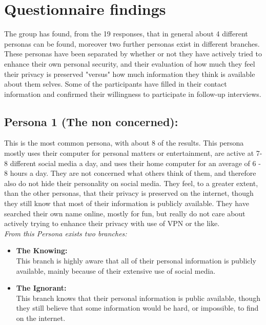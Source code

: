 \section{Questionnaire findings}
The group has found, from the 19 responses, that in general about 4 different personas can be found, moreover two further personas exist in different branches. These personas have been separated by whether or not they have actively tried to enhance their own personal security, and their evaluation of how much they feel their privacy is preserved "versus" how much information they think is available about them selves. Some of the participants have filled in their contact information and confirmed their willingness to participate in follow-up interviews.

\subsection{Persona 1 (The non concerned):}
This is the most common persona, with about 8 of the results.
This persona mostly uses their computer for personal matters or entertainment, are active at 7-8 different social media a day,
and uses their home computer for an average of 6 - 8 hours a day.
They are not concerned what others think of them, and therefore also do not hide their personality on social media.
They feel, to a greater extent, than the other personas, that their privacy is preserved on the internet, though they still know that most of their information is publicly available.
They have searched their own name online, mostly for fun, but really do not care about actively trying to enhance their privacy with use of VPN or the like.\\

\textit{From this Persona exists two branches:}
\begin{itemize}
    \item 
    \textbf{The Knowing:}\\
    This branch is highly aware that all of their personal information is publicly available, mainly because of their extensive use of social media.
    \item 
    \textbf{The Ignorant:}\\
    This branch knows that their personal information is public available, though they still believe that some information would be hard, or impossible, to find on the internet.
\end{itemize}

